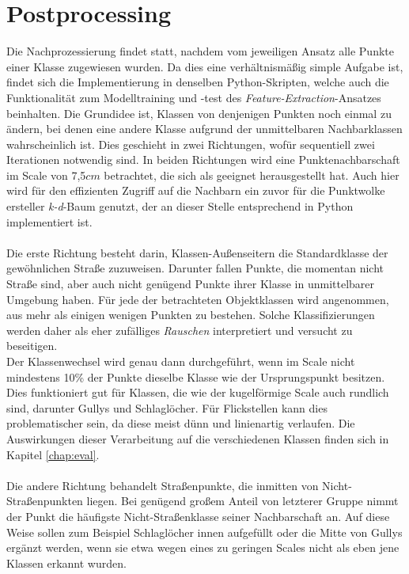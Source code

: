 
\chapter{Postprocessing}
\label{chap:postproc}

Die Nachprozessierung findet statt, nachdem vom jeweiligen Ansatz alle Punkte einer Klasse zugewiesen wurden. Da dies eine verhältnismäßig simple Aufgabe ist, findet sich die Implementierung in denselben Python-Skripten, welche auch die Funktionalität zum Modelltraining und -test des \textit{Feature-Extraction}-Ansatzes beinhalten. Die Grundidee ist, Klassen von denjenigen Punkten noch einmal zu ändern, bei denen eine andere Klasse aufgrund der unmittelbaren Nachbarklassen wahrscheinlich ist. Dies geschieht in zwei Richtungen, wofür sequentiell zwei Iterationen notwendig sind. In beiden Richtungen wird eine Punktenachbarschaft im Scale von 7,5$cm$ betrachtet, die sich als geeignet herausgestellt hat. Auch hier wird für den effizienten Zugriff auf die Nachbarn ein zuvor für die Punktwolke ersteller \textit{k-d}-Baum genutzt, der an dieser Stelle entsprechend in Python implementiert ist. \\\\
Die erste Richtung besteht darin, Klassen-Außenseitern die Standardklasse der gewöhnlichen Straße zuzuweisen. Darunter fallen Punkte, die momentan nicht Straße sind, aber auch nicht genügend Punkte ihrer Klasse in unmittelbarer Umgebung haben. Für jede der betrachteten Objektklassen wird angenommen, aus mehr als einigen wenigen Punkten zu bestehen. Solche Klassifizierungen werden daher als eher zufälliges \textit{Rauschen} interpretiert und versucht zu beseitigen. \\
Der Klassenwechsel wird genau dann durchgeführt, wenn im Scale nicht mindestens 10\% der Punkte dieselbe Klasse wie der Ursprungspunkt besitzen. Dies funktioniert gut für Klassen, die wie der kugelförmige Scale auch rundlich sind, darunter Gullys und Schlaglöcher. Für Flickstellen kann dies problematischer sein, da diese meist dünn und linienartig verlaufen. Die Auswirkungen dieser Verarbeitung auf die verschiedenen Klassen finden sich in Kapitel \ref{chap:eval}. \\\\
Die andere Richtung behandelt Straßenpunkte, die inmitten von Nicht-Straßenpunkten liegen. Bei genügend großem Anteil von letzterer Gruppe nimmt der Punkt die häufigste Nicht-Straßenklasse seiner Nachbarschaft an. Auf diese Weise sollen zum Beispiel Schlaglöcher innen aufgefüllt oder die Mitte von Gullys ergänzt werden, wenn sie etwa wegen eines zu geringen Scales nicht als eben jene Klassen erkannt wurden. \\

